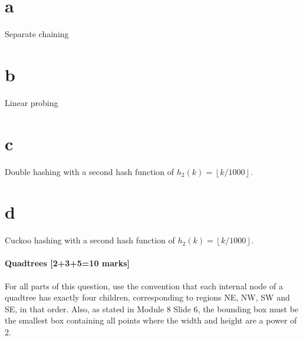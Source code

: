 \documentclass[12pt]{article}
\newcommand{\floor}[1]{\left\lfloor#1\right\rfloor}
\begin{document}
	\begin{enumerate}
		\part{a} Separate chaining
		\part{b} Linear probing
		\part{c} Double hashing with a second hash function of $h_{2}(k) = \floor{k/1000}$.
		\part{d} Cuckoo hashing with a second hash function of $h_{2}(k) = \floor{k/1000}$.
		
	\end{enumerate}
	
	
	\subsection{Quadtrees [2+3+5=10 marks]}
	For all parts of this question, use the convention that each internal node of a quadtree has exactly four children, corresponding to regions NE, NW, SW and SE, in that order.  Also, as stated in Module 8 Slide 6, the bounding box must be the smallest box containing all points where the width and height are a power of 2.
	
\end{document}
